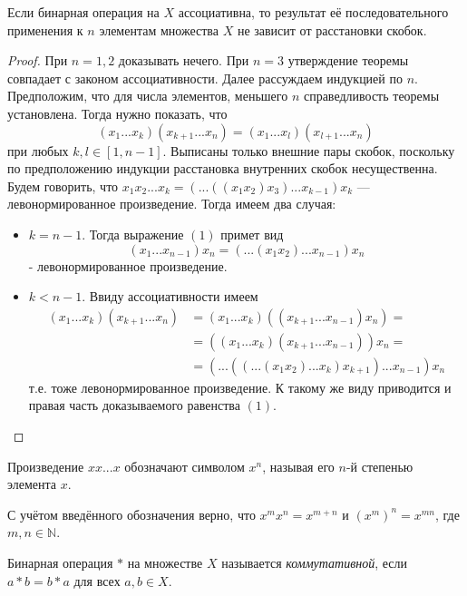 \begin{theorem}
    Если бинарная операция на $X$ ассоциативна, то результат её последовательного применения к $n$ элементам множества $X$ не зависит от расстановки скобок.
\end{theorem}
\begin{proof}
    При $n=1,2$ доказывать нечего. При $n=3$ утверждение теоремы совпадает с законом ассоциативности. Далее рассуждаем индукцией по $n$. Предположим, что для числа элементов, меньшего $n$ справедливость теоремы установлена. Тогда нужно показать, что
    \begin{equation}
        (x_1...x_k)(x_{k+1}...x_n)=(x_1...x_l)(x_{l+1}...x_n) \tag{1}
    \end{equation}
    при любых $k,l\in [1,n-1]$. Выписаны только внешние пары скобок, поскольку по предположению индукции расстановка внутренних скобок несущественна.
    Будем говорить, что $x_1x_2...x_k=(...((x_1x_2)x_3)...x_{k-1})x_k$ --- левонормированное произведение. Тогда имеем два случая:
    \begin{itemize}
        \item $k=n-1$. Тогда выражение $(1)$ примет вид $$(x_1...x_{n-1})x_n=(...(x_1x_2)...x_{n-1})x_n$$ - левонормированное произведение.
        \item $k<n-1$. Ввиду ассоциативности имеем
        \begin{align*}
            (x_1...x_k)(x_{k+1}...x_n)&=(x_1...x_k)((x_{k+1}...x_{n-1})x_n)= \\
            &= ((x_1...x_k)(x_{k+1}...x_{n-1}))x_n= \\
            &= (...((...(x_1x_2)...x_k)x_{k+1})...x_{n-1})x_n
        \end{align*}
        т.е. тоже левонормированное произведение. К такому же виду приводится и правая часть доказываемого равенства $(1)$.\qedhere
    \end{itemize}
\end{proof}
\begin{remark}
    Произведение $xx...x$ обозначают символом $x^n$, называя его $n$-й степенью элемента $x$.
\end{remark}
\begin{consequence}\label{Consequense:x^m x^n = x^{m+n}}
    С учётом введённого обозначения верно, что $x^m x^n = x^{m+n}$ и $(x^m)^n=x^{mn}$, где $m,n\in \mathbb{N}$.
\end{consequence}

\begin{definition}
    Бинарная операция $*$ на множестве $X$ называется \textit{коммутативной}, если $a*b=b*a$ для всех $a,b \in X$.
\end{definition}

